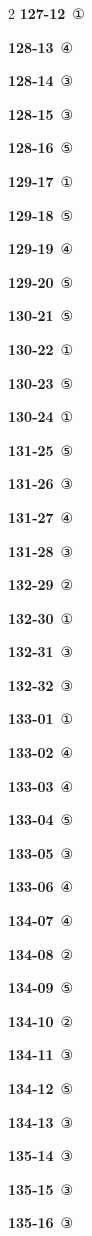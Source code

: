 \documentclass[10pt,a4paper]{article}
\begin{document}
\begin{multicols}{2}
\noindent\textbf{127-12}\ ①\par
\noindent\textbf{128-13}\ ④\par
\noindent\textbf{128-14}\ ③\par
\noindent\textbf{128-15}\ ③\par
\noindent\textbf{128-16}\ ⑤\par
\noindent\textbf{129-17}\ ①\par
\noindent\textbf{129-18}\ ⑤\par
\noindent\textbf{129-19}\ ④\par
\noindent\textbf{129-20}\ ⑤\par
\noindent\textbf{130-21}\ ⑤\par
\noindent\textbf{130-22}\ ①\par
\noindent\textbf{130-23}\ ⑤\par
\noindent\textbf{130-24}\ ①\par
\noindent\textbf{131-25}\ ⑤\par
\noindent\textbf{131-26}\ ③\par
\noindent\textbf{131-27}\ ④\par
\noindent\textbf{131-28}\ ③\par
\noindent\textbf{132-29}\ ②\par
\noindent\textbf{132-30}\ ①\par
\noindent\textbf{132-31}\ ③\par
\noindent\textbf{132-32}\ ③\par
\noindent\textbf{133-01}\ ①\par
\noindent\textbf{133-02}\ ④\par
\noindent\textbf{133-03}\ ④\par
\noindent\textbf{133-04}\ ⑤\par
\noindent\textbf{133-05}\ ③\par
\noindent\textbf{133-06}\ ④\par
\noindent\textbf{134-07}\ ④\par
\noindent\textbf{134-08}\ ②\par
\noindent\textbf{134-09}\ ⑤\par
\noindent\textbf{134-10}\ ②\par
\noindent\textbf{134-11}\ ③\par
\noindent\textbf{134-12}\ ⑤\par
\noindent\textbf{134-13}\ ③\par
\noindent\textbf{135-14}\ ③\par
\noindent\textbf{135-15}\ ③\par
\noindent\textbf{135-16}\ ③\par

\end{multicols}
\end{document}
